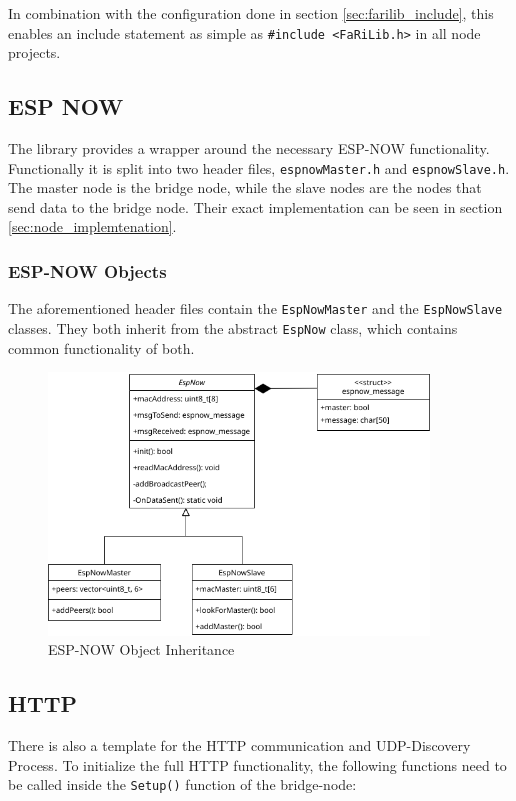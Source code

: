         In combination with the configuration done in section \ref{sec:farilib_include},
        this enables an include statement as simple as \texttt{\#include <FaRiLib.h>} in all
        node projects.

    \subsection{ESP NOW} \label{sec:farilib_espnow}
    The library provides a wrapper around the necessary ESP-NOW functionality.
    Functionally it is split into two header files, \texttt{espnowMaster.h} and 
    \texttt{espnowSlave.h}. The master node is the bridge node, while the slave
    nodes are the nodes that send data to the bridge node. Their exact implementation
    can be seen in section \ref{sec:node_implemtenation}.
        
        \subsubsection{ESP-NOW Objects}
        The aforementioned header files contain the \texttt{EspNowMaster} and the
        \texttt{EspNowSlave} classes. They both inherit from the abstract 
        \texttt{EspNow} class, which contains common functionality of both.
        \begin{figure}[H]
            \centering
            \includegraphics[width=0.9\textwidth]{topics/flowcharts/ESP-NOW-Inheritence.drawio.png}
            \caption{ESP-NOW Object Inheritance}
        \end{figure}
        
    \subsection{HTTP} \label{sec:farilib_http}
    There is also a template for the HTTP communication and 
    UDP-Discovery Process. To initialize the full HTTP functionality,
    the following functions need to be called inside the \texttt{Setup()}
    function of the bridge-node:

